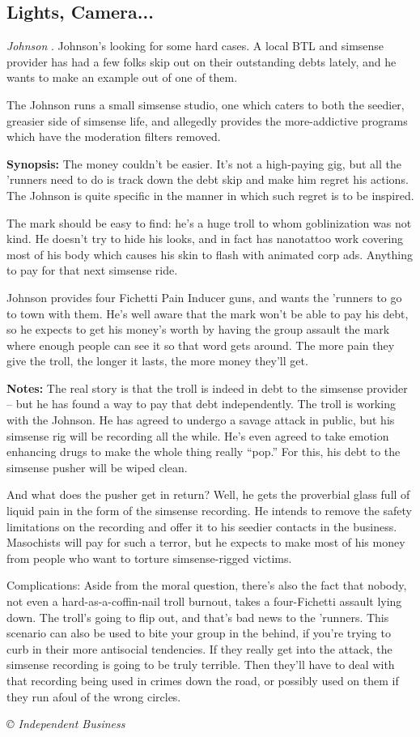 \documentclass[letterpaper,onecolumn,10pt]{article}
\renewcommand{\textsc}[1]{{\fontspec{Friz Quadrata SC TT}\selectfont #1}}
\newcommand{\getyear}[1]{\StrLeft{#1}{4}}
\newenvironment{scenario}[6]
	{
		\section[#1 {\small\textsc{[#2]}}]{#1} \nopagebreak

		\noindent{\textsc{#2}}\nopagebreak

		\noindent\textit{#3}\nopagebreak
		\def\TMPSCENARIO{{\small\textit{©\getyear{#5}{} #4}}}
	}
	{\TMPSCENARIO}
\newcommand{\sectionlabel}[1]{\textbf{#1: }}
\newcommand{\johnson}[2]{\sectionlabel{Johnson: #1 (#2)}}
\newcommand{\synopsis}{\sectionlabel{Synopsis}}
\newcommand{\notes}{\sectionlabel{Notes}}
\begin{document}
\begin{multicols}{2}
\begin{scenario}{Lights, Camera...}
\johnson{Johnson}{Independent Business}  Mr. Johnson's looking for some hard cases. A local BTL and simsense provider has had a few folks skip out on their outstanding debts lately, and he wants to make an example out of one of them.

The Johnson runs a small simsense studio, one which caters to both the seedier, greasier side of simsense life, and allegedly provides the more-addictive programs which have the moderation filters removed.

\synopsis  The money couldn't be easier. It's not a high-paying gig, but all the 'runners need to do is track down the debt skip and make him regret his actions. The Johnson is quite specific in the manner in which such regret is to be inspired.

The mark should be easy to find: he's a huge troll to whom goblinization was not kind. He doesn't try to hide his looks, and in fact has nanotattoo work covering most of his body which causes his skin to flash with animated corp ads. Anything to pay for that next simsense ride.

Johnson provides four Fichetti Pain Inducer guns, and wants the 'runners to go to town with them. He's well aware that the mark won't be able to pay his debt, so he expects to get his money's worth by having the group assault the mark where enough people can see it so that word gets around. The more pain they give the troll, the longer it lasts, the more money they'll get.

\notes  The real story is that the troll is indeed in debt to the simsense provider – but he has found a way to pay that debt independently. The troll is working with the Johnson. He has agreed to undergo a savage attack in public, but his simsense rig will be recording all the while. He's even agreed to take emotion enhancing drugs to make the whole thing really ``pop.'' For this, his debt to the simsense pusher will be wiped clean.

And what does the pusher get in return? Well, he gets the proverbial glass full of liquid pain in the form of the simsense recording. He intends to remove the safety limitations on the recording and offer it to his seedier contacts in the business. Masochists will pay for such a terror, but he expects to make most of his money from people who want to torture simsense-rigged victims.

Complications: Aside from the moral question, there's also the fact that nobody, not even a hard-as-a-coffin-nail troll burnout, takes a four-Fichetti assault lying down. The troll's going to flip out, and that's bad news to the 'runners. This scenario can also be used to bite your group in the behind, if you're trying to curb in their more antisocial tendencies. If they really get into the attack, the simsense recording is going to be truly terrible. Then they'll have to deal with that recording being used in crimes down the road, or possibly used on them if they run afoul of the wrong circles. 


\end{scenario}
\end{multicols}
\end{document}
